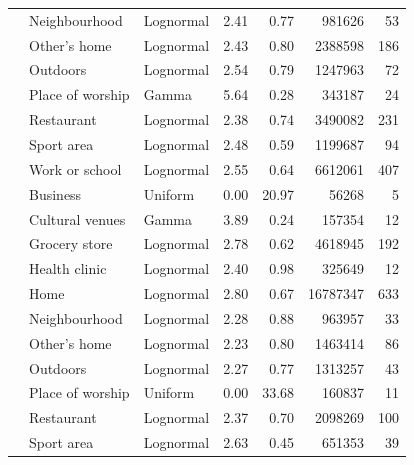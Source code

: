 \documentclass[preprint, 3p,
authoryear]{elsarticle} %
\begin{document}
\begin{table}
{\begin{threeparttable}
\begin{tabular}[t]{rllrrrr}
 & Neighbourhood & Lognormal & 2.41 & 0.77 & 981626 & 53\\

 & Other's home & Lognormal & 2.43 & 0.80 & 2388598 & 186\\

 & Outdoors & Lognormal & 2.54 & 0.79 & 1247963 & 72\\

 & Place of worship & Gamma & 5.64 & 0.28 & 343187 & 24\\

 & Restaurant & Lognormal & 2.38 & 0.74 & 3490082 & 231\\

 & Sport area & Lognormal & 2.48 & 0.59 & 1199687 & 94\\

\multirow[t]{-12}{*}{\raggedleft\arraybackslash 2015} & Work or school & Lognormal & 2.55 & 0.64 & 6612061 & 407\\
\cmidrule{1-7}
 & Business & Uniform & 0.00 & 20.97 & 56268 & 5\\

 & Cultural venues & Gamma & 3.89 & 0.24 & 157354 & 12\\

 & Grocery store & Lognormal & 2.78 & 0.62 & 4618945 & 192\\

 & Health clinic & Lognormal & 2.40 & 0.98 & 325649 & 12\\

 & Home & Lognormal & 2.80 & 0.67 & 16787347 & 633\\

 & Neighbourhood & Lognormal & 2.28 & 0.88 & 963957 & 33\\

 & Other's home & Lognormal & 2.23 & 0.80 & 1463414 & 86\\

 & Outdoors & Lognormal & 2.27 & 0.77 & 1313257 & 43\\

 & Place of worship & Uniform & 0.00 & 33.68 & 160837 & 11\\

 & Restaurant & Lognormal & 2.37 & 0.70 & 2098269 & 100\\

 & Sport area & Lognormal & 2.63 & 0.45 & 651353 & 39\\


\end{tabular}
\end{threeparttable}}
\end{table}
\end{document}
